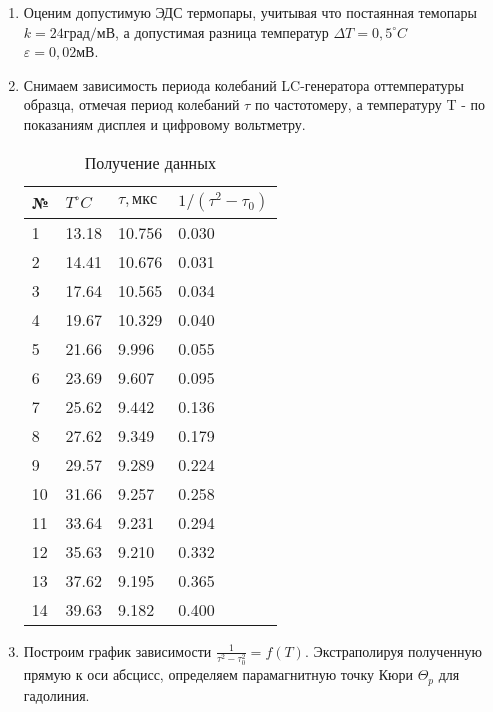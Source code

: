 \documentclass[12pt,a4paper]{article}
\begin{document}
\begin{enumerate}
    \item Оценим допустимую ЭДС термопары, учитывая что постаянная темопары $k = 24 град/мВ$, а допустимая разница температур $\Delta T = 0,5  ^\circ C$ \\
$\varepsilon = 0,02 мВ$. 
    \item  Снимаем зависимость периода колебаний LC-генератора оттемпературы образца, отмечая
период колебаний $\tau $ по частотомеру, а температуру T -  по показаниям дисплея и цифровому вольтметру.

\begin{table}[H]
    \centering
    \begin{center}
    \end{center}
    \vspace{0.1cm}
    \label{tab:my_label}
    \begin{tabular}{ |p{2cm}|p{2cm}|p{2cm}|p{2cm}|}
 \hline
 № & $T  ^\circ C$ & $\tau, мкс$ & $1/(\tau^2-\tau_0)$ \\
 \hline
    1 & 13.18 & 10.756 & 0.030 \\
 \hline
    2 & 14.41 & 10.676 & 0.031\\
   \hline
    3 & 17.64 & 10.565 & 0.034\\
    \hline
    4 & 19.67 & 10.329 & 0.040\\
 \hline
    5 & 21.66 & 9.996 & 0.055\\
   \hline
    6 & 23.69 & 9.607 & 0.095\\
    \hline
    7 & 25.62 & 9.442 & 0.136\\
 \hline
    8 & 27.62 & 9.349 & 0.179\\
   \hline
    9 & 29.57 & 9.289 & 0.224\\
    \hline
    10 & 31.66 & 9.257 & 0.258\\
 \hline
    11 & 33.64 & 9.231 & 0.294\\
   \hline
    12 & 35.63 & 9.210 & 0.332\\
    \hline
    13 & 37.62 & 9.195 & 0.365\\
 \hline
    14 & 39.63 & 9.182 & 0.400\\
\hline
\end{tabular}
\caption{Получение данных}
\end{table}
\item Построим график зависимости $\frac{1}{\tau^2-\tau_0^2}= f(T)$. Экстраполируя полученную прямую к оси абсцисс, определяем парамагнитную точку Кюри $\Theta_p$ для гадолиния.


\end{enumerate}
\end{document}
